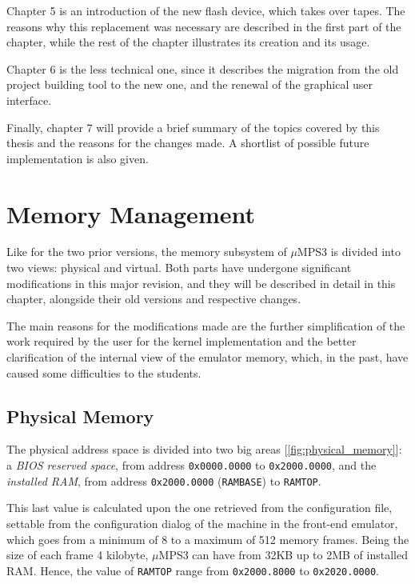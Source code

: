 \documentclass[12pt,a4paper,openright,twoside]{report}
\begin{document}
Chapter 5 is an introduction of the new flash device, which takes over tapes.
The reasons why this replacement was necessary are described in the first part of the chapter, while the rest of the chapter illustrates its creation and its usage.

Chapter 6 is the less technical one, since it describes the migration from the old project building tool to the new one, and the renewal of the graphical user interface.

Finally, chapter 7 will provide a brief summary of the topics covered by this thesis and the reasons for the changes made.
A shortlist of possible future implementation is also given.

\chapter{Memory Management}
\lhead[\fancyplain{}{\bfseries\thepage}]{\fancyplain{}{\bfseries\rightmark}}
Like for the two prior versions, the memory subsystem of $\mu$MPS3 is divided into two views: physical and virtual.
Both parts have undergone significant modifications in this major revision, and they will be described in detail in this chapter, alongside their old versions and respective changes.

The main reasons for the modifications made are the further simplification of the work required by the user for the kernel implementation and the better clarification of the internal view of the emulator memory, which, in the past, have caused some difficulties to the students.

\section{Physical Memory}
\label{chap:physical_memory}
The physical address space is divided into two big areas [\autoref{fig:physical_memory}]: a \textit{BIOS reserved space}, from address \texttt{0x0000.0000} to \texttt{0x2000.0000}, and the \textit{installed RAM}, from address \texttt{0x2000.0000} (\texttt{RAMBASE}) to \texttt{RAMTOP}.

This last value is calculated upon the one retrieved from the configuration file, settable from the configuration dialog of the machine in the front-end emulator, which goes from a minimum of 8 to a maximum of 512 memory frames.
Being the size of each frame 4 kilobyte, $\mu$MPS3 can have from 32KB up to 2MB of installed RAM.
Hence, the value of \texttt{RAMTOP} range from \texttt{0x2000.8000} to \texttt{0x2020.0000}.
\end{document}
